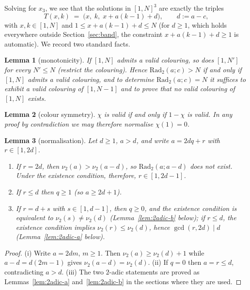 \documentclass[11pt]{article}
\newtheorem{lemma}{Lemma}[section]
\theoremstyle{remark}
\theoremstyle{definition}
\newcommand{\Rad}{\mathrm{Rad}_2}
\newcommand{\vtwo}{\nu_2}
\begin{document}
Solving for $x_3$, we see that the solutions in $[1,N]^3$ are exactly the
triples
\begin{equation}\label{eq:triples}
T(x,k) \;=\; \bigl(x,\; k,\; x + a(k-1) + d\bigr), \qquad d := a - c,
\end{equation}
with $x, k \in [1,N]$ and $1 \le x + a(k-1) + d \le N$ (for $d \ge 1$, which
holds everywhere outside Section~\ref{sec:band}, the constraint
$x + a(k-1) + d \ge 1$ is automatic). We record two standard facts.

\begin{lemma}[monotonicity]\label{lem:mono}
If $[1,N]$ admits a valid colouring, so does $[1,N']$ for every $N' \le N$
(restrict the colouring). Hence $\Rad(a;c) > N$ if and only if $[1,N]$
admits a valid colouring, and to determine $\Rad(a;c) = N$ it suffices to
exhibit a valid colouring of $[1,N-1]$ and to prove that no valid colouring
of $[1,N]$ exists.
\end{lemma}

\begin{lemma}[colour symmetry]\label{lem:wlog}
$\chi$ is valid if and only if $1-\chi$ is valid. In any proof by
contradiction we may therefore normalise $\chi(1) = 0$.
\end{lemma}

\begin{lemma}[normalisation]\label{lem:norm}
Let $d \ge 1$, $a > d$, and write $a = 2dq + r$ with $r \in [1, 2d]$.
\begin{enumerate}
\item[(i)] If $r = 2d$, then $\vtwo(a) > \vtwo(a-d)$, so $\Rad(a;a-d)$ does
not exist. Under the existence condition, therefore, $r \in [1, 2d-1]$.
\item[(ii)] If $r \le d$ then $q \ge 1$ (so $a \ge 2d+1$).
\item[(iii)] If $r = d + s$ with $s \in [1, d-1]$, then $q \ge 0$, and the
existence condition is equivalent to $\vtwo(s) \ne \vtwo(d)$
(Lemma~\ref{lem:2adic-b} below); if $r \le d$, the existence condition
implies $\vtwo(r) \le \vtwo(d)$, hence $\gcd(r,2d) \mid d$
(Lemma~\ref{lem:2adic-a} below).
\end{enumerate}
\end{lemma}

\begin{proof}
(i) Write $a = 2dm$, $m \ge 1$. Then $\vtwo(a) \ge \vtwo(d)+1$ while
$a - d = d(2m-1)$ gives $\vtwo(a-d) = \vtwo(d)$.
(ii) If $q = 0$ then $a = r \le d$, contradicting $a > d$.
(iii) The two $2$-adic statements are proved as
Lemmas~\ref{lem:2adic-a} and~\ref{lem:2adic-b} in the sections where they
are used.
\end{proof}
\end{document}
